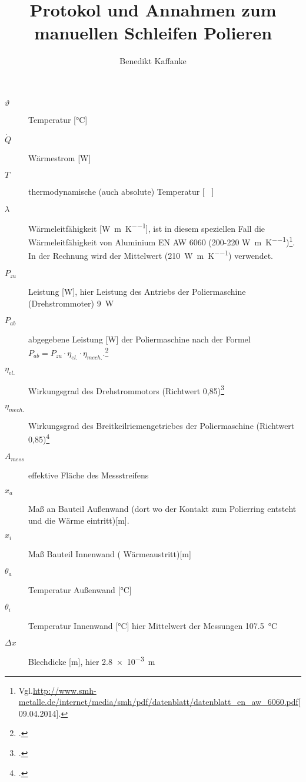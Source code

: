 \documentclass[12pt,a4paper,parskip]{scrartcl}
\begin{document}
\author{Benedikt Kaffanke}
\title{Protokol und Annahmen zum manuellen Schleifen Polieren}
\maketitle
\newpage
\tableofcontents
\begin{description}
\item[ $\vartheta $] Temperatur  [\si{\degreeCelsius}]
\item[$ \dot{Q} $ ] Wärmestrom [\si{\watt}]
\item[$ \si{T}$] thermodynamische (auch absolute) Temperatur [\si{\kelvin
}]
\item[$\lambda $] Wärmeleitfähigkeit [\si{\watt\per\metre\per\kelvin}], ist in diesem speziellen Fall die Wärmeleitfähigkeit von Aluminium EN AW 6060 (200-220 \si{\watt\per\meter\per\kelvin})\footnote{Vgl.\url{http://www.smh-metalle.de/internet/media/smh/pdf/datenblatt/datenblatt_en_aw_6060.pdf}[09.04.2014].}. In der Rechnung wird der Mittelwert (\SI{210}{\watt\per\meter\per\kelvin}) verwendet.
\item[$ P_{zu} $] Leistung [\si{\watt}], hier Leistung des Antriebs der Poliermaschine (Drehstrommoter)  \SI{9}{\watt}
\item[$P_{ab} $]  abgegebene Leistung [\si{\watt}] der Poliermaschine nach der Formel $ P_{ab} = P_{zu} \cdot \eta_{el.} \cdot \eta_{mech.}$.\footcite[Vgl.][R2]{g}
\item[$\eta_{el.} $] Wirkungsgrad des Drehstrommotors (Richtwert 0,85)\footcite[Vgl.][40]{tm}
\item[$\eta_{mech.} $]Wirkungsgrad des Breitkeilriemengetriebes der Poliermaschine (Richtwert 0,85)\footcite[Vgl.][40]{tm}
\item[$A_{mess} $] effektive Fläche des Messstreifens
\item[$x_a $]  Maß an Bauteil Außenwand (dort wo der Kontakt zum Polierring entsteht und die Wärme eintritt)[\si{\meter}]. 
\item[$x_i$] Maß Bauteil Innenwand ( Wärmeaustritt)[\si{\meter}]
\item[$\theta_a$] Temperatur Außenwand [\si{\degreeCelsius}] 
\item[$\theta_i$] Temperatur Innenwand [\si{\degreeCelsius}] hier Mittelwert der Messungen \SI{107.5}{\degreeCelsius} 
\item[$ \Delta x $] Blechdicke [\si{\meter}], hier \SI{2.8e-3}{\meter}

\end{description}
\end{document}
